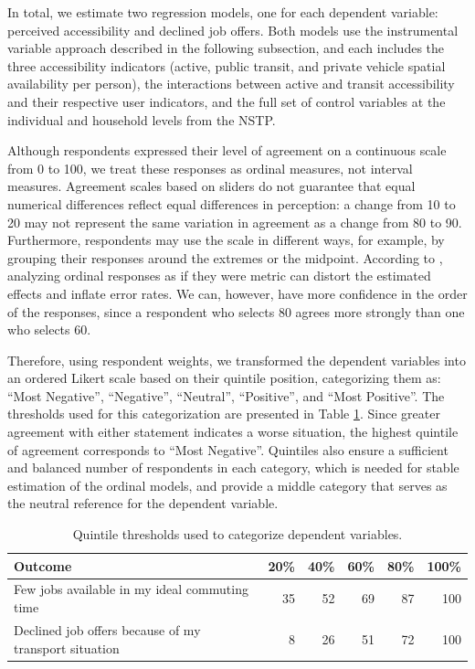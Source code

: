 \documentclass[preprint, 3p,
authoryear]{elsarticle} %
\begin{document}
In total, we estimate two regression models, one for each dependent
variable: perceived accessibility and declined job offers. Both models
use the instrumental variable approach described in the following
subsection, and each includes the three accessibility indicators
(active, public transit, and private vehicle spatial availability per
person), the interactions between active and transit accessibility and
their respective user indicators, and the full set of control variables
at the individual and household levels from the NSTP.

Although respondents expressed their level of agreement on a continuous
scale from 0 to 100, we treat these responses as ordinal measures, not
interval measures. Agreement scales based on sliders do not guarantee
that equal numerical differences reflect equal differences in
perception: a change from 10 to 20 may not represent the same variation
in agreement as a change from 80 to 90. Furthermore, respondents may use
the scale in different ways, for example, by grouping their responses
around the extremes or the midpoint. According to \citet{liddell2018},
analyzing ordinal responses as if they were metric can distort the
estimated effects and inflate error rates. We can, however, have more
confidence in the order of the responses, since a respondent who selects
80 agrees more strongly than one who selects 60.

Therefore, using respondent weights, we transformed the dependent
variables into an ordered Likert scale based on their quintile position,
categorizing them as: ``Most Negative'', ``Negative'', ``Neutral'',
``Positive'', and ``Most Positive''. The thresholds used for this
categorization are presented in Table \ref{tab:outcomes_quintiles}.
Since greater agreement with either statement indicates a worse
situation, the highest quintile of agreement corresponds to ``Most
Negative''. Quintiles also ensure a sufficient and balanced number of
respondents in each category, which is needed for stable estimation of
the ordinal models, and provide a middle category that serves as the
neutral reference for the dependent variable.

\begin{table}
\centering
\caption{\label{tab:outcomes-quintiles}\label{tab:outcomes_quintiles}Quintile thresholds used to categorize dependent variables.}
\centering
\fontsize{10}{12}\selectfont
\begin{tabular}[t]{lrrrrr}
\toprule
Outcome & 20\% & 40\% & 60\% & 80\% & 100\%\\
\midrule
Few jobs available in my ideal commuting time & 35 & 52 & 69 & 87 & 100\\
Declined job offers because of my transport situation & 8 & 26 & 51 & 72 & 100\\
\bottomrule
\end{tabular}
\end{table}
\end{document}
